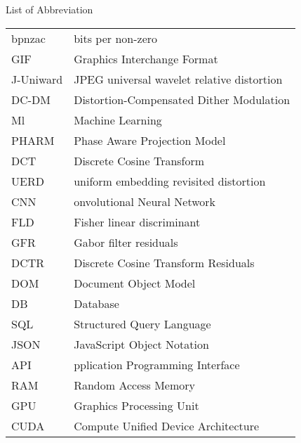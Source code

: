 List of Abbreviation
\begin{tabular}{l l}
    bpnzac&bits per non-zero\\
    GIF&Graphics Interchange Format\\
    J-Uniward&JPEG universal wavelet relative distortion\\
    DC-DM&Distortion-Compensated Dither Modulation\\
Ml&Machine Learning\\
PHARM&Phase Aware Projection Model\\
DCT&Discrete Cosine Transform\\
UERD&uniform embedding revisited distortion\\ 
CNN&onvolutional Neural Network\\
FLD&Fisher linear discriminant\\
GFR&Gabor filter residuals\\
DCTR&Discrete Cosine Transform Residuals\\
DOM&Document Object Model\\
DB&Database\\
SQL&Structured Query Language\\
JSON&JavaScript Object Notation\\
API&pplication Programming Interface\\
RAM&Random Access Memory\\
GPU&Graphics Processing Unit\\
CUDA&Compute Unified Device Architecture\\
\end{tabular}

